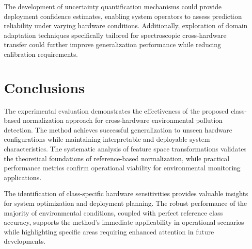 The development of uncertainty quantification mechanisms could provide deployment confidence estimates, enabling system operators to assess prediction reliability under varying hardware conditions. Additionally, exploration of domain adaptation techniques specifically tailored for spectroscopic cross-hardware transfer could further improve generalization performance while reducing calibration requirements.

\section{Conclusions}

The experimental evaluation demonstrates the effectiveness of the proposed class-based normalization approach for cross-hardware environmental pollution detection. The method achieves successful generalization to unseen hardware configurations while maintaining interpretable and deployable system characteristics. The systematic analysis of feature space transformations validates the theoretical foundations of reference-based normalization, while practical performance metrics confirm operational viability for environmental monitoring applications.

The identification of class-specific hardware sensitivities provides valuable insights for system optimization and deployment planning. The robust performance of the majority of environmental conditions, coupled with perfect reference class accuracy, supports the method's immediate applicability in operational scenarios while highlighting specific areas requiring enhanced attention in future developments.